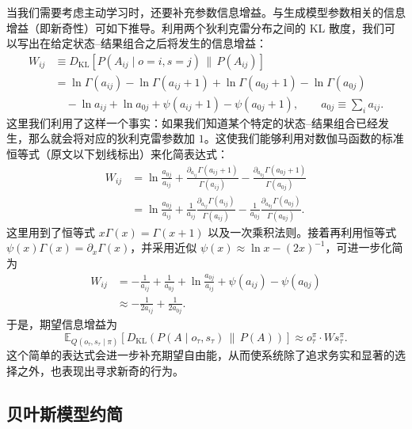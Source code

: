 当我们需要考虑主动学习时，还要补充参数信息增益。与生成模型参数相关的信息增益（即新奇性）可如下推导。利用两个狄利克雷分布之间的 KL 散度，我们可以写出在给定状态--结果组合之后将发生的信息增益：
\begin{align}
W_{ij}
&\equiv
D_{\mathrm{KL}}\!\left[P(A_{ij} \mid o=i, s=j)\,\|\,P(A_{ij})\right]
\nonumber\\
&=
\ln \Gamma(a_{ij})
- \ln \Gamma(a_{ij}+1)
+ \ln \Gamma(a_{0j}+1)
- \ln \Gamma(a_{0j})
\nonumber\\
&\quad
- \ln a_{ij}
+ \ln a_{0j}
+ \psi(a_{ij}+1)
- \psi(a_{0j}+1),
\qquad
a_{0j} \equiv \sum_i a_{ij}.
\tag{B.31}
\end{align}
这里我们利用了这样一个事实：如果我们知道某个特定的状态--结果组合已经发生，那么就会将对应的狄利克雷参数加 $1$。这使我们能够利用对数伽马函数的标准恒等式（原文以下划线标出）来化简表达式：
\begin{align}
W_{ij}
&=
\ln \frac{a_{0j}}{a_{ij}}
+ \frac{\partial_{a_{ij}} \Gamma(a_{ij}+1)}{\Gamma(a_{ij})}
- \frac{\partial_{a_{0j}} \Gamma(a_{0j}+1)}{\Gamma(a_{0j})}
\nonumber\\
&=
\ln \frac{a_{0j}}{a_{ij}}
+ \frac{1}{a_{ij}}\frac{\partial_{a_{ij}} \Gamma(a_{ij})}{\Gamma(a_{ij})}
- \frac{1}{a_{0j}}\frac{\partial_{a_{0j}} \Gamma(a_{0j})}{\Gamma(a_{0j})}.
\tag{B.32}
\end{align}
这里用到了恒等式 $x\Gamma(x)=\Gamma(x+1)$ 以及一次乘积法则。接着再利用恒等式 $\psi(x)\Gamma(x)=\partial_x \Gamma(x)$，并采用近似 $\psi(x)\approx \ln x - (2x)^{-1}$，可进一步化简为
\begin{align}
W_{ij}
&=
-\frac{1}{a_{ij}}
+ \frac{1}{a_{0j}}
+ \ln \frac{a_{0j}}{a_{ij}}
+ \psi(a_{ij})
- \psi(a_{0j})
\nonumber\\
&\approx
-\frac{1}{2a_{ij}}
+ \frac{1}{2a_{0j}}.
\tag{B.33}
\end{align}
于是，期望信息增益为
\begin{equation}
\mathbb{E}_{Q(o_\tau, s_\tau \mid \pi)}
\!\left[
D_{\mathrm{KL}}\!\left(P(A \mid o_\tau, s_\tau)\,\|\,P(A)\right)
\right]
\approx
o_\tau^{\pi} \cdot W s_\tau^{\pi}.
\tag{B.34}
\end{equation}
这个简单的表达式会进一步补充期望自由能，从而使系统除了追求务实和显著的选择之外，也表现出寻求新奇的行为。

\subsection{贝叶斯模型约简}

